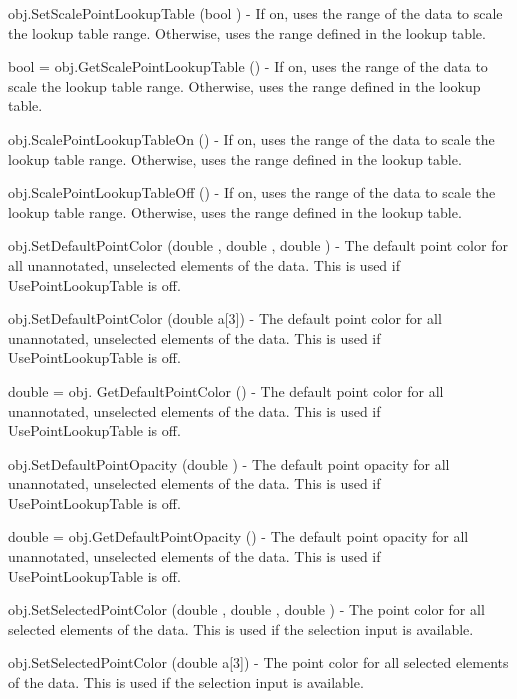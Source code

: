 \begin{DoxyItemize}
\item {\ttfamily obj.\-Set\-Scale\-Point\-Lookup\-Table (bool )} -\/ If on, uses the range of the data to scale the lookup table range. Otherwise, uses the range defined in the lookup table.  
\item {\ttfamily bool = obj.\-Get\-Scale\-Point\-Lookup\-Table ()} -\/ If on, uses the range of the data to scale the lookup table range. Otherwise, uses the range defined in the lookup table.  
\item {\ttfamily obj.\-Scale\-Point\-Lookup\-Table\-On ()} -\/ If on, uses the range of the data to scale the lookup table range. Otherwise, uses the range defined in the lookup table.  
\item {\ttfamily obj.\-Scale\-Point\-Lookup\-Table\-Off ()} -\/ If on, uses the range of the data to scale the lookup table range. Otherwise, uses the range defined in the lookup table.  
\item {\ttfamily obj.\-Set\-Default\-Point\-Color (double , double , double )} -\/ The default point color for all unannotated, unselected elements of the data. This is used if Use\-Point\-Lookup\-Table is off.  
\item {\ttfamily obj.\-Set\-Default\-Point\-Color (double a\mbox{[}3\mbox{]})} -\/ The default point color for all unannotated, unselected elements of the data. This is used if Use\-Point\-Lookup\-Table is off.  
\item {\ttfamily double = obj. Get\-Default\-Point\-Color ()} -\/ The default point color for all unannotated, unselected elements of the data. This is used if Use\-Point\-Lookup\-Table is off.  
\item {\ttfamily obj.\-Set\-Default\-Point\-Opacity (double )} -\/ The default point opacity for all unannotated, unselected elements of the data. This is used if Use\-Point\-Lookup\-Table is off.  
\item {\ttfamily double = obj.\-Get\-Default\-Point\-Opacity ()} -\/ The default point opacity for all unannotated, unselected elements of the data. This is used if Use\-Point\-Lookup\-Table is off.  
\item {\ttfamily obj.\-Set\-Selected\-Point\-Color (double , double , double )} -\/ The point color for all selected elements of the data. This is used if the selection input is available.  
\item {\ttfamily obj.\-Set\-Selected\-Point\-Color (double a\mbox{[}3\mbox{]})} -\/ The point color for all selected elements of the data. This is used if the selection input is available.  

\end{DoxyItemize}
